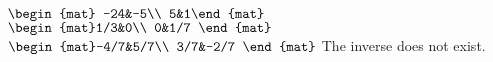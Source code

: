 \begin{Answer}
\Question $\begin{mat} -24&-5\\  5&1\end{mat}$
\Question $\begin{mat}1/3&0\\  0&1/7 \end{mat}$
\Question $\begin{mat}-4/7&5/7\\  3/7&-2/7 \end{mat}$
\Question The inverse does not exist.
\end{Answer}

